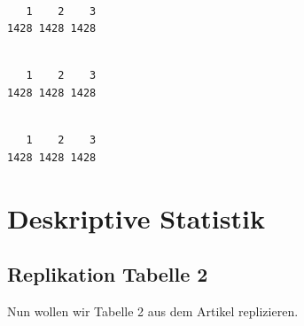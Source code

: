 \documentclass[
  letterpaper,
  DIV=11,
  numbers=noendperiod]{scrartcl}
\newenvironment{Shaded}{\begin{snugshade}}{\end{snugshade}}
\newcommand{\CommentTok}[1]{\textcolor[rgb]{0.37,0.37,0.37}{#1}}
\newcommand{\FunctionTok}[1]{\textcolor[rgb]{0.28,0.35,0.67}{#1}}
\newcommand{\NormalTok}[1]{\textcolor[rgb]{0.00,0.23,0.31}{#1}}
\newcommand{\SpecialCharTok}[1]{\textcolor[rgb]{0.37,0.37,0.37}{#1}}
\begin{document}
\begin{Shaded}
\end{Shaded}

\begin{verbatim}

   1    2    3 
1428 1428 1428 
\end{verbatim}

\begin{Shaded}
\end{Shaded}

\begin{verbatim}

   1    2    3 
1428 1428 1428 
\end{verbatim}

\begin{Shaded}
\end{Shaded}

\begin{verbatim}

   1    2    3 
1428 1428 1428 
\end{verbatim}

\section{Deskriptive Statistik}\label{deskriptive-statistik}

\subsection{Replikation Tabelle 2}\label{replikation-tabelle-2}

Nun wollen wir Tabelle 2 aus dem Artikel replizieren.
\end{document}
